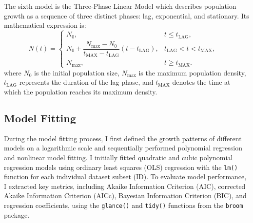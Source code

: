 \documentclass[12pt]{article}
\begin{document}
The sixth model is the Three-Phase Linear Model \citep{Buchanan1997} which describes population growth as a sequence of three distinct phases: lag, exponential, and stationary. Its mathematical expression is:
\begin{equation}
N(t)=
\begin{cases}
N_0, & t \leq t_{\text{LAG}}, \\[6pt]
N_0 + \dfrac{N_{\max} - N_0}{t_{\text{MAX}} - t_{\text{LAG}}}(t - t_{\text{LAG}}), & t_{\text{LAG}} < t < t_{\text{MAX}}, \\[6pt]
N_{\max}, & t \geq t_{\text{MAX}}.
\end{cases} \quad 
\end{equation}
where \(N_0\) is the initial population size, \(N_{\max}\) is the maximum population density, \(t_{\text{LAG}}\) represents the duration of the lag phase, and \(t_{\text{MAX}}\) denotes the time at which the population reaches its maximum density.

\subsection{Model Fitting}
During the model fitting process, I first defined the growth patterns of different models on a logarithmic scale and sequentially performed polynomial regression and nonlinear model fitting. I initially fitted quadratic and cubic polynomial regression models using ordinary least squares (OLS) regression with the \texttt{lm()} function for each individual dataset subset (ID). To evaluate model performance, I extracted key metrics, including Akaike Information Criterion (AIC), corrected Akaike Information Criterion (AICc), Bayesian Information Criterion (BIC), and regression coefficients, using the \texttt{glance()} and \texttt{tidy()} functions from the \texttt{broom} package.
\end{document}
